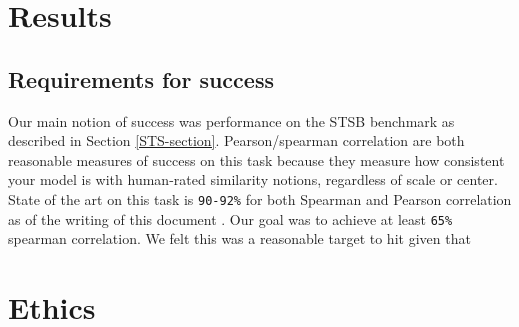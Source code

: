 \documentclass[14pt]{article}
\begin{document}
\section{Results}
\subsection{Requirements for success}
Our main notion of success was performance on the STSB \cite{STS} benchmark as described in Section \ref{STS-section}. Pearson/spearman correlation are both reasonable measures of success on this task because they measure how consistent your model is with human-rated similarity notions, regardless of scale or center. State of the art on this task is \verb|90-92%| for both Spearman and Pearson correlation as of the writing of this document \cite{muennighoff2022mteb}. Our goal was to achieve at least \verb|65%| spearman correlation. We felt this was a reasonable target to hit given that 

\section{Ethics}
\end{document}
